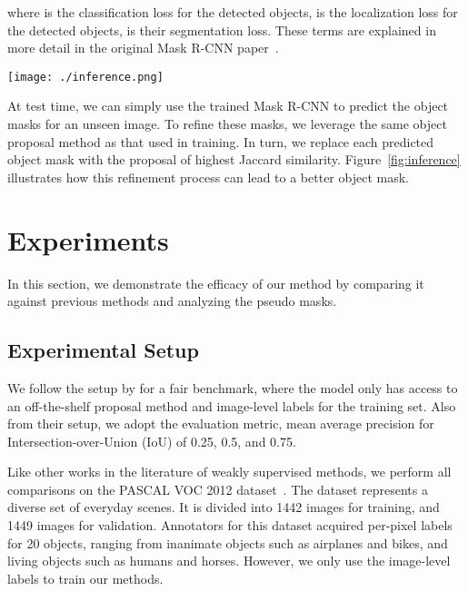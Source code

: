 \documentclass{bmvc2k}
\begin{document}
where  is the classification loss for the detected objects,  is the localization loss for the detected objects,  is their segmentation loss. These terms are explained in more detail in the original Mask R-CNN paper~\cite{he2017mask}.

\begin{figure*}[t]
    \centering
    \texttt{[image: ./inference.png]}\vspace{-13mm}
    \caption{{\bf Inference.} At test time, only the trained Mask-RCNN is required to output the prediction masks in the image. As an optional refinement step, the predicted masks can be replaced with the object proposals of highest Jaccard similarity.}
    \label{fig:inference}
\end{figure*}

At test time, we can simply use the trained Mask R-CNN to predict the object masks for an unseen image. To refine these masks, we leverage the same object proposal method as that used in training. In turn, we replace each predicted object mask with the proposal of highest Jaccard similarity. Figure~\ref{fig:inference} illustrates how this refinement process can lead to a better object mask.












\section{Experiments}
\label{sec:experimental_setup}

In this section, we demonstrate the efficacy of our method by comparing it against previous methods and analyzing the pseudo masks.

\subsection{Experimental Setup}
We follow the setup by \cite{Zhou2018PRM, cholakkal2019object} for a fair benchmark, where the model only has access to an off-the-shelf proposal method and image-level labels for the training set. Also from their setup, we adopt the evaluation metric, mean average precision for Intersection-over-Union (IoU) of 0.25, 0.5, and 0.75. 

Like other works in the literature of weakly supervised methods, we perform all comparisons on the PASCAL VOC 2012 dataset~\cite{everingham2010pascal}. The dataset represents a diverse set of everyday scenes. It is divided into 1442 images for training, and 1449 images for validation. Annotators for this dataset acquired per-pixel labels for 20 objects, ranging from inanimate objects such as airplanes and bikes, and living objects such as humans and horses. However, we only use the image-level labels to train our methods.
\end{document}

